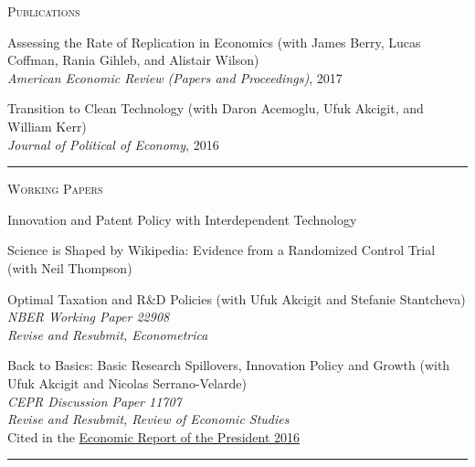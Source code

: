 \documentclass{article}
\begin{document}
\parbox{\textwidth}{
\parbox[t]{0.28\textwidth}{ \raggedright \noindent \textsc{ Publications } }
\parbox[t]{0.72\textwidth}{ \raggedright

Assessing the Rate of Replication in Economics (with James Berry, Lucas Coffman, Rania Gihleb, and Alistair Wilson) \\
\textit{American Economic Review (Papers and Proceedings)}, 2017
\vspace{0.27cm}

Transition to Clean Technology (with Daron Acemoglu, Ufuk Akcigit, and William Kerr) \\
\textit{Journal of Political of Economy}, 2016
\vspace{0.27cm}

}
\textcolor{light-gray}{\hrule}
}
\vspace{0.3cm}

\parbox{\textwidth}{
\parbox[t]{0.28\textwidth}{ \raggedright \noindent \textsc{ Working Papers } }
\parbox[t]{0.72\textwidth}{ \raggedright

Innovation and Patent Policy with Interdependent Technology
\vspace{0.27cm}

Science is Shaped by Wikipedia: Evidence from a Randomized Control Trial (with Neil Thompson)
\vspace{0.27cm}

Optimal Taxation and R\&D Policies (with Ufuk Akcigit and Stefanie Stantcheva)  \\
 \textit{NBER Working Paper 22908}  \\
 \textit{Revise and Resubmit, Econometrica}
\vspace{0.27cm}

Back to Basics: Basic Research Spillovers, Innovation Policy and Growth (with Ufuk Akcigit and Nicolas Serrano-Velarde)  \\
 \textit{CEPR Discussion Paper 11707}  \\
 \textit{Revise and Resubmit, Review of Economic Studies}  \\
 Cited in the \href{https://www.gpo.gov/fdsys/pkg/ERP-2016/pdf/ERP-2016.pdf}{Economic Report of the President 2016}
\vspace{0.27cm}

}
\textcolor{light-gray}{\hrule}
}
\vspace{0.3cm}
\end{document}
